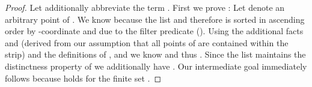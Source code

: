 \begin{isabellebody}
\begin{isamarkuptext}
\begin{proof}
Let additionally  abbreviate the term .
First we prove : Let  denote an arbitrary point of \mbox{}. We know
 because the list  and therefore \mbox{} is sorted in ascending order by -coordinate and
\mbox{} due to the filter predicate ().
Using the additional facts  and  (derived from our assumption
that all points of  are contained within the  strip)
and the definitions of ,  and  we know  and thus .
Since the list  maintains the distinctness property of  we additionally have
\mbox{}. Our intermediate goal immediately follows because
 holds for the finite set .


\end{proof}
\end{isamarkuptext}
\end{isabellebody}

